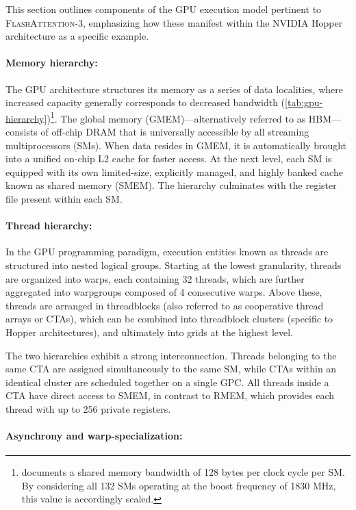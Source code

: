 This section outlines components of the GPU execution model pertinent to \textsc{FlashAttention-3}, emphasizing how these manifest within the NVIDIA Hopper architecture as a specific example.

\paragraph{Memory hierarchy:} The GPU architecture structures its memory as a series of data localities, where increased capacity generally corresponds to decreased bandwidth (\cref{tab:gpu-hierarchy})\footnote{\citet{luo2024benchmarking} documents a shared memory bandwidth of 128 bytes per clock cycle per SM. By considering all 132 SMs operating at the boost frequency of 1830 MHz, this value is accordingly scaled.}. The global memory (GMEM)—alternatively referred to as HBM—consists of off-chip DRAM that is universally accessible by all streaming multiprocessors (SMs). When data resides in GMEM, it is automatically brought into a unified on-chip L2 cache for faster access. At the next level, each SM is equipped with its own limited-size, explicitly managed, and highly banked cache known as shared memory (SMEM). The hierarchy culminates with the register file present within each SM.

\paragraph{Thread hierarchy:} In the GPU programming paradigm, execution entities known as threads are structured into nested logical groups. Starting at the lowest granularity, threads are organized into warps, each containing 32 threads, which are further aggregated into warpgroups composed of 4 consecutive warps. Above these, threads are arranged in threadblocks (also referred to as cooperative thread arrays or CTAs), which can be combined into threadblock clusters (specific to Hopper architectures), and ultimately into grids at the highest level.

The two hierarchies exhibit a strong interconnection. Threads belonging to the same CTA are assigned simultaneously to the same SM, while CTAs within an identical cluster are scheduled together on a single GPC. All threads inside a CTA have direct access to SMEM, in contrast to RMEM, which provides each thread with up to 256 private registers.

\paragraph{Asynchrony and warp-specialization:}

